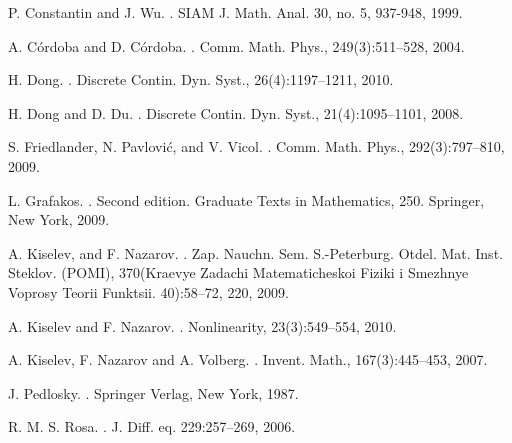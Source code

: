 \documentclass{amsart}
\numberwithin{Theorem}{section}
\theoremstyle{definition}
\theoremstyle{remark}
\begin{document}
\begin{thebibliography}{References}
P. Constantin and J. Wu.
.
\newblock SIAM J. Math. Anal. 30, no. 5, 937-948, 1999.

A. C\'ordoba and D. C\'ordoba.
.
\newblock Comm. Math. Phys., 249(3):511--528, 2004.


H. Dong.
.
\newblock Discrete Contin. Dyn. Syst., 26(4):1197--1211, 2010.

H. Dong and D. Du.
.
\newblock Discrete Contin. Dyn. Syst., 21(4):1095--1101, 2008.

S. Friedlander, N. Pavlovi\'c, and V. Vicol.
.
\newblock Comm. Math. Phys., 292(3):797--810, 2009.

L. Grafakos.
.
\newblock Second edition. Graduate Texts in Mathematics, 250. Springer, New York, 2009.

A. Kiselev, and F. Nazarov.
.
\newblock Zap. Nauchn. Sem. S.-Peterburg. Otdel. Mat. Inst. Steklov. (POMI), 370(Kraevye Zadachi Matematicheskoi Fiziki i Smezhnye Voprosy Teorii Funktsii. 40):58--72, 220, 2009.

A. Kiselev and F. Nazarov.
.
\newblock Nonlinearity, 23(3):549--554, 2010.

A. Kiselev, F. Nazarov and A. Volberg.
.
\newblock Invent. Math., 167(3):445--453, 2007.


 J. Pedlosky.
.
\newblock Springer Verlag, New York, 1987.

 R. M. S. Rosa.
.
\newblock  J. Diff. eq. 229:257--269, 2006.


\end{thebibliography}
\end{document}
